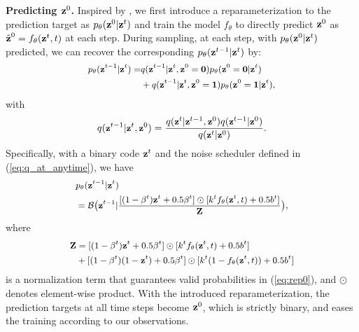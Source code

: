 \documentclass[10pt,twocolumn,letterpaper]{article}
\begin{document}
\noindent \textbf{Predicting $\textbf{z}^0$.}
Inspired by \cite{vqdiff}, 
we first introduce a reparameterization to the prediction target as $p_\theta(\textbf{z}^0|\textbf{z}^t)$ and train the model $f_\theta$ to directly predict $\textbf{z}^0$ as $\hat{\textbf{z}}^0 = f_\theta(\textbf{z}^t, t)$ at each step.
During sampling, at each step, with $p_\theta(\textbf{z}^0|\textbf{z}^t)$ predicted, we can recover the corresponding 
$p_\theta(\textbf{z}^{t-1} | \textbf{z}^t)$ by:
\begin{equation}
\label{eq:one_step}
\small
\begin{aligned}
    p_\theta(\textbf{z}^{t-1} | \textbf{z}^{t}) = & q(\textbf{z}^{t-1} | \textbf{z}^t, \textbf{z}^0 = \textbf{0}) p_\theta(\textbf{z}^0 = \textbf{0} | \textbf{z}^t) \\& + q(\textbf{z}^{t-1} | \textbf{z}^t, \textbf{z}^0 = \textbf{1}) p_\theta(\textbf{z}^0 = \textbf{1} | \textbf{z}^t), 
\end{aligned}
\end{equation}
with 
\begin{equation}
\small
    q(\textbf{z}^{t-1} | \textbf{z}^{t}, \textbf{z}^0) = \frac{q(\textbf{z}^t | \textbf{z}^{t-1}, \textbf{z}^0) q(\textbf{z}^{t-1}| \textbf{z}^0)}{q(\textbf{z}^t | \textbf{z}^0)}.
\end{equation}
Specifically, with a binary code $\textbf{z}^t$ and the noise scheduler defined in (\ref{eq:q_at_anytime}), we have 
\begin{equation}
\small
\begin{aligned}
\label{eq:rep0}
    &p_\theta(\textbf{z}^{t-1}|\textbf{z}^t) \\
    &= \mathcal{B} \big(\textbf{z}^{t-1} | \frac{[(1-\beta^t)\textbf{z}^t + 0.5\beta^t] \odot [k^t f_\theta(\textbf{z}^t, t) + 0.5b^t]}{\mathbf{Z}} \big),
\end{aligned}
\end{equation}
where 
\begin{equation}
\small
\begin{aligned}
    \mathbf{Z} &= [(1-\beta^t)\textbf{z}^t + 0.5\beta^t] \odot [k^t f_\theta(\textbf{z}^t, t) + 0.5b^t] \\
    &+ [(1-\beta^t)(1-\textbf{z}^t) + 0.5\beta^t] \odot [k^t (1-f_\theta(\textbf{z}^t, t)) + 0.5b^t]
\end{aligned}
\end{equation}
is a normalization term that guarantees valid probabilities in (\ref{eq:rep0}), and $\odot$ denotes element-wise product.
With the introduced reparameterization, the prediction targets at all time steps become $\textbf{z}^0$, which is strictly binary, and eases the training according to our observations. 
\end{document}
